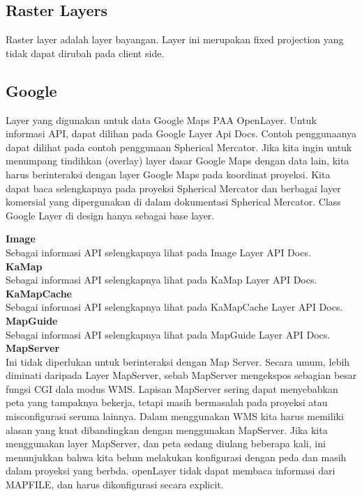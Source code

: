 \documentclass{article}
\begin{document}
\subsection {Raster Layers}
Raster layer adalah layer bayangan. Layer ini merupakan fixed projection yang tidak dapat dirubah pada client side.

\subsection {Google}
Layer yang digunakan untuk data Google Maps PAA OpenLayer. Untuk informasi API, dapat dilihan pada Google Layer Api Docs. 
Contoh penggunaanya dapat dilihat pada contoh penggunaan Spherical Mercator.
Jika kita ingin untuk menumpang tindihkan (overlay) layer dasar Google Maps dengan data lain, kita harus berinteraksi dengan layer Google Maps pada koordinat proyeksi.
Kita dapat baca selengkapnya pada proyeksi Spherical Mercator dan berbagai layer komersial yang dipergunakan di dalam dokumentasi Spherical Mercator.
Class Google Layer di design hanya sebagai base layer.

\textbf{Image} \\
Sebagai informasi API selengkapnya lihat pada Image Layer API Docs.\\
\textbf{KaMap} \\
Sebagai informasi API selengkapnya lihat pada KaMap Layer API Docs.\\
\textbf{KaMapCache} \\
Sebagai informasi API selengkapnya lihat pada KaMapCache Layer API Docs.\\
\textbf{MapGuide} \\
Sebagai informasi API selengkapnya lihat pada MapGuide Layer API Docs.\\
\textbf{MapServer} \\
Ini tidak diperlukan untuk berinteraksi dengan Map Server. Secara umum, lebih diminati daripada Layer MapServer, sebab MapServer mengekspos sebagian besar fungsi CGI dala modus WMS.
Lapisan MapServer sering dapat menyebabkan peta yang tampaknya bekerja, tetapi masih bermasalah pada proyeksi atau misconfigurasi seruma lainnya.
Dalam menggunakan WMS kita harus memiliki alasan yang kuat dibandingkan dengan menggunakan MapServer.
Jika kita menggunakan layer MapServer, dan peta sedang diulang beberapa kali, ini menunjukkan bahwa kita belum melakukan konfigurasi dengan peda dan masih dalam proyeksi yang berbda.
openLayer tidak dapat membaca informasi dari MAPFILE, dan harus dikonfigurasi secara explicit.\\
\end{document}
